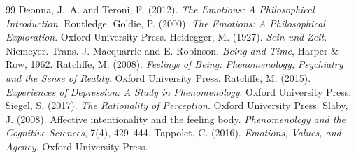 \documentclass{situationist-preprint}
\begin{document}
\begin{thebibliography}{99}\small
{} Deonna, J.~A. and Teroni, F. (2012). \emph{The Emotions: A Philosophical Introduction}. Routledge.
 Goldie, P. (2000). \emph{The Emotions: A Philosophical Exploration}. Oxford University Press.
 Heidegger, M. (1927). \emph{Sein und Zeit}. Niemeyer. Trans. J. Macquarrie and E. Robinson, \emph{Being and Time}, Harper \& Row, 1962.
 Ratcliffe, M. (2008). \emph{Feelings of Being: Phenomenology, Psychiatry and the Sense of Reality}. Oxford University Press.
 Ratcliffe, M. (2015). \emph{Experiences of Depression: A Study in Phenomenology}. Oxford University Press.
 Siegel, S. (2017). \emph{The Rationality of Perception}. Oxford University Press.
 Slaby, J. (2008). Affective intentionality and the feeling body. \emph{Phenomenology and the Cognitive Sciences}, 7(4), 429--444.
 Tappolet, C. (2016). \emph{Emotions, Values, and Agency}. Oxford University Press.
\end{thebibliography}
\end{document}
